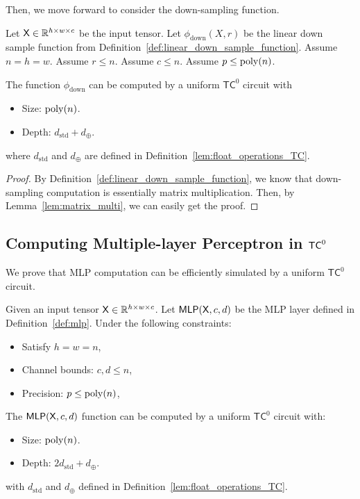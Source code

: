 Then, we move forward to consider the down-sampling function.
\begin{lemma}\label{lem:down_tc0}
    Let $\mathsf{X} \in \mathbb{R}^{h \times w \times c}$ be the input tensor. Let $\phi_{\mathrm{down}}(X,r)$ be the linear down sample function from Definition~\ref{def:linear_down_sample_function}. Assume $n = h = w$. Assume $r \leq n$. Assume $c \leq n$. Assume $p \leq \operatorname{poly}(n)$.

    The function $\phi_{\mathrm{down}}$ can be computed by a uniform $\mathsf{TC}^0$ circuit with

    \begin{itemize}
        \item Size: $\operatorname{poly}(n)$.
        \item Depth: $d_\mathrm{std} + d_{\oplus}$.
    \end{itemize}
    where $d_{\mathrm{std}}$ and $d_{\oplus}$ are defined in Definition~\ref{lem:float_operations_TC}.
\end{lemma}
\begin{proof}
    By Definition~\ref{def:linear_down_sample_function}, we know that down-sampling computation is essentially matrix multiplication. Then, by Lemma~\ref{lem:matrix_multi}, we can easily get the proof.
\end{proof}







\subsection{Computing Multiple-layer Perceptron in \texorpdfstring{$\mathsf{TC}^0$}{} }\label{sec:mlp_tc0}
 We prove that MLP computation can be efficiently simulated by a uniform $\mathsf{TC}^0$ circuit.
\begin{lemma}\label{lem:mlp_tc0_informal}
    Given an input tensor $\mathsf{X}\in \mathbb{R}^{h \times w \times c}$. Let $\mathsf{MLP}(\mathsf{X},c,d)$ be the MLP layer defined in Definition~\ref{def:mlp}. Under the following constraints:
    \begin{itemize}
        \item Satisfy $h = w = n$,
        \item Channel bounds: $c, d\leq n$,
        \item Precision: $p \leq \operatorname{poly}(n)$,
    \end{itemize}
    The $\mathsf{MLP}(\mathsf{X},c,d)$ function can be computed by a uniform $\mathsf{TC}^0$ circuit with:
    \begin{itemize}
        \item Size: $\operatorname{poly}(n)$.
        \item Depth: $2d_\mathrm{std} + d_{\oplus}$.
    \end{itemize}
    with $d_{\mathrm{std}}$ and $d_{\oplus}$ defined in Definition~\ref{lem:float_operations_TC}.
\end{lemma}




